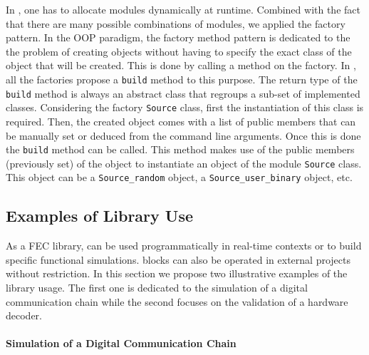 In \AFFECT, one has to allocate modules dynamically at runtime. Combined with
the fact that there are many possible combinations of modules, we applied the
factory pattern. In the OOP paradigm, the factory method pattern is dedicated to
the the problem of creating objects without having to specify the exact class of
the object that will be created. This is done by calling a method on the
factory. In \AFFECT, all the factories propose a \verb|build| method to this
purpose. The return type of the \verb|build| method is always an abstract class
that regroups a sub-set of implemented classes. Considering the factory
\verb|Source| class, first the instantiation of this class is required. Then,
the created object comes with a list of public members that can be manually set
or deduced from the command line arguments. Once this is done the \verb|build|
method can be called. This method makes use of the public members (previously
set) of the object to instantiate an object of the module \verb|Source| class.
This object can be a \verb|Source_random| object, a \verb|Source_user_binary|
object, etc.

\subsection{Examples of Library Use}
\label{sec:aff3ct_library_example}

As a FEC library, \AFFECT can be used programmatically in real-time contexts or
to build specific functional simulations. \AFFECT blocks can also be operated in
external projects without restriction. In this section we propose two
illustrative examples of the \AFFECT library usage. The first one is dedicated
to the simulation of a digital communication chain while the second focuses on
the validation of a hardware decoder.

\paragraph{Simulation of a Digital Communication Chain}

